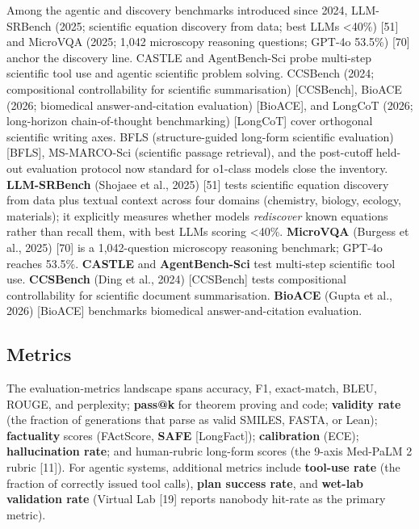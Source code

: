 Among the agentic and discovery benchmarks introduced since 2024, LLM-SRBench (2025; scientific equation discovery from data; best LLMs \textless40\%) {[}51{]} and MicroVQA (2025; 1,042 microscopy reasoning questions; GPT-4o 53.5\%) {[}70{]} anchor the discovery line. CASTLE and AgentBench-Sci probe multi-step scientific tool use and agentic scientific problem solving. CCSBench (2024; compositional controllability for scientific summarisation) {[}CCSBench{]}, BioACE (2026; biomedical answer-and-citation evaluation) {[}BioACE{]}, and LongCoT (2026; long-horizon chain-of-thought benchmarking) {[}LongCoT{]} cover orthogonal scientific writing axes. BFLS (structure-guided long-form scientific evaluation) {[}BFLS{]}, MS-MARCO-Sci (scientific passage retrieval), and the post-cutoff held-out evaluation protocol now standard for o1-class models close the inventory. \textbf{LLM-SRBench} (Shojaee et al., 2025) {[}51{]} tests scientific equation discovery from data plus textual context across four domains (chemistry, biology, ecology, materials); it explicitly measures whether models \emph{rediscover} known equations rather than recall them, with best LLMs scoring \textless40\%. \textbf{MicroVQA} (Burgess et al., 2025) {[}70{]} is a 1,042-question microscopy reasoning benchmark; GPT-4o reaches 53.5\%. \textbf{CASTLE} and \textbf{AgentBench-Sci} test multi-step scientific tool use. \textbf{CCSBench} (Ding et al., 2024) {[}CCSBench{]} tests compositional controllability for scientific document summarisation. \textbf{BioACE} (Gupta et al., 2026) {[}BioACE{]} benchmarks biomedical answer-and-citation evaluation.

\subsection{Metrics}\label{metrics}

The evaluation-metrics landscape spans accuracy, F1, exact-match, BLEU, ROUGE, and perplexity; \textbf{pass@k} for theorem proving and code; \textbf{validity rate} (the fraction of generations that parse as valid SMILES, FASTA, or Lean); \textbf{factuality} scores (FActScore, \textbf{SAFE} {[}LongFact{]}); \textbf{calibration} (ECE); \textbf{hallucination rate}; and human-rubric long-form scores (the 9-axis Med-PaLM 2 rubric {[}11{]}). For agentic systems, additional metrics include \textbf{tool-use rate} (the fraction of correctly issued tool calls), \textbf{plan success rate}, and \textbf{wet-lab validation rate} (Virtual Lab {[}19{]} reports nanobody hit-rate as the primary metric).

